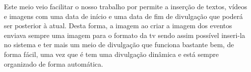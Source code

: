 Este meio veio facilitar o nosso trabalho por permite a inserção de textos, vídeos e imagens com uma data de início e uma data de fim de divulgação que poderá ser posterior à atual. Desta forma, a imagem ao criar a imagem dos eventos enviava sempre uma imagem para o formato da tv sendo assim possível inseri-la no sistema e ter mais um meio de divulgação que funciona bastante bem, de forma fácil, uma vez que é tem uma divulgação dinâmica e está sempre organizado de forma automática.